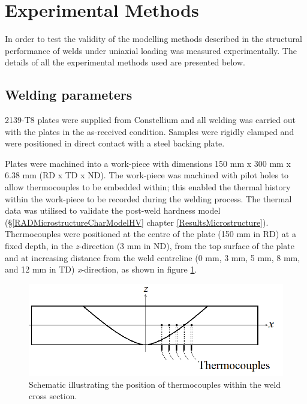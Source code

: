 \section{Experimental Methods}
\label{EM}
In order to test the validity of the modelling methods described in %
the structural performance of welds under uniaxial loading was measured experimentally. The details of all the experimental methods used are presented below.
\subsection{Welding parameters}
\label{EMTensileWeldParameters}
2139-T8 plates were supplied from Constellium and all welding was carried out with the plates in the as-received condition. Samples were rigidly clamped and were positioned in direct contact with a steel backing plate.

Plates were machined into a work-piece with dimensions 150 mm x 300 mm x 6.38 mm (RD x TD x ND). The work-piece was machined with pilot holes to allow thermocouples to be embedded within; this enabled the thermal history within the work-piece to be recorded during the welding process. The thermal data was utilised to validate the post-weld hardness model (\S\ref{RADMicrostructureCharModelHV} chapter \ref{ResultsMicrostructure}). 
Thermocouples were positioned at the centre of the plate (150 mm in RD) at a fixed depth, in the \textit{z}-direction (3 mm in ND), from the top surface of the plate and at increasing distance from the weld centreline (0 mm, 3 mm, 5 mm, 8 mm, and 12 mm in TD) \textit{x}-direction, as shown in figure \ref{fig:Thermocouples}. 

\begin{figure}
	\centering
	\includegraphics[width=0.65\linewidth]{Figures/ExperimentalMethods/Thermocouples}
	\caption[Thermocouple positions]{Schematic illustrating the position of thermocouples within the weld cross section.}	
	\label{fig:Thermocouples}
\end{figure} 

